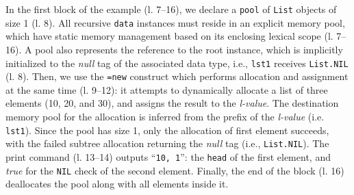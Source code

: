 \documentclass{sig-alternate}
\newcommand{\CEU}{\textsc{C\'{e}u}\xspace}
\newcommand{\code}[1] {{\small{\texttt{#1}}}}
\begin{document}

In the first block of the example (l. 7--16), we declare a \code{pool} of 
\code{List} objects of size 1 (l. 8).
%
All recursive \code{data} instances must reside in an explicit memory pool, 
which have static memory management based on its enclosing lexical scope (l.  
7--16).
%
A pool also represents the reference to the root instance, which is implicitly 
initialized to the \emph{null} tag of the associated data type, i.e., 
\code{lst1} receives \code{List.NIL} (l. 8).
%
Then, we use the \code{=new} construct which performs
allocation and assignment at the same time (l. 9--12):
it attempts to dynamically allocate a list of three elements (10, 20, and 30),
and assigns the result to the \emph{l-value}.
The destination memory pool for the allocation is inferred from the prefix of 
the \emph{l-value} (i.e. \code{lst1}).
%
Since the pool has size 1, only the allocation of first element succeeds, with 
the failed subtree allocation returning the \emph{null} tag (i.e., 
\code{List.NIL}).
The print command (l. 13--14) outputs ``\texttt{10, 1}'': the \code{head} of 
the first element, and \emph{true} for the \code{NIL} check of the second 
element.
%
Finally, the end of the block (l. 16) deallocates the pool along with all 
elements inside it.
\end{document}
